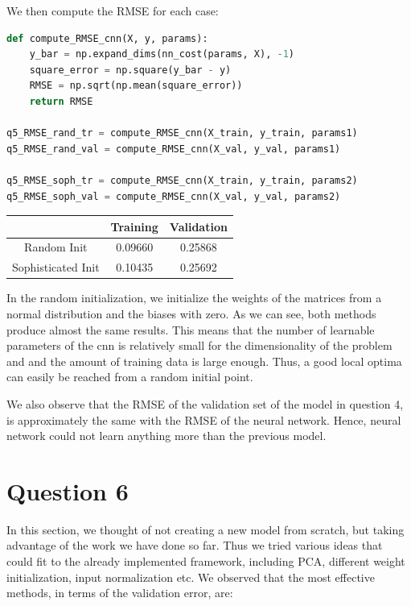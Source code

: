 \documentclass{article}
\begin{document}
We then compute the RMSE for each case:

\begin{lstlisting}[language=Python]
def compute_RMSE_cnn(X, y, params):
    y_bar = np.expand_dims(nn_cost(params, X), -1)
    square_error = np.square(y_bar - y)
    RMSE = np.sqrt(np.mean(square_error))
    return RMSE

q5_RMSE_rand_tr = compute_RMSE_cnn(X_train, y_train, params1)
q5_RMSE_rand_val = compute_RMSE_cnn(X_val, y_val, params1)

q5_RMSE_soph_tr = compute_RMSE_cnn(X_train, y_train, params2)
q5_RMSE_soph_val = compute_RMSE_cnn(X_val, y_val, params2)
\end{lstlisting}

\begin{center}
\begin{tabular}{ | c | c | c | }
\hline
 & Training & Validation \\
\hline
Random Init & 0.09660 & 0.25868 \\ 
\hline
Sophisticated Init & 0.10435 & 0.25692 \\ 
\hline
\end{tabular}
\end{center}

In the random initialization, we initialize the weights of the matrices from a normal distribution and the biases with zero.
As we can see, both methods produce almost the same results. This means that the number of learnable parameters of the cnn is relatively small for the dimensionality of the problem and and the amount of training data is large enough. Thus, a good local optima can easily be reached from a random initial point.

We also observe that the RMSE of the validation set of the model in question 4, is approximately the same with the RMSE of the neural network. Hence, neural network could not learn anything more than the previous model. 


\section*{Question 6}

In this section, we thought of not creating a new model from scratch, but taking advantage of the work we have done so far. Thus we tried various ideas that could fit to the already implemented framework, including PCA, different weight initialization, input normalization etc. We observed that the most effective methods, in terms of the validation error, are:
\end{document}
